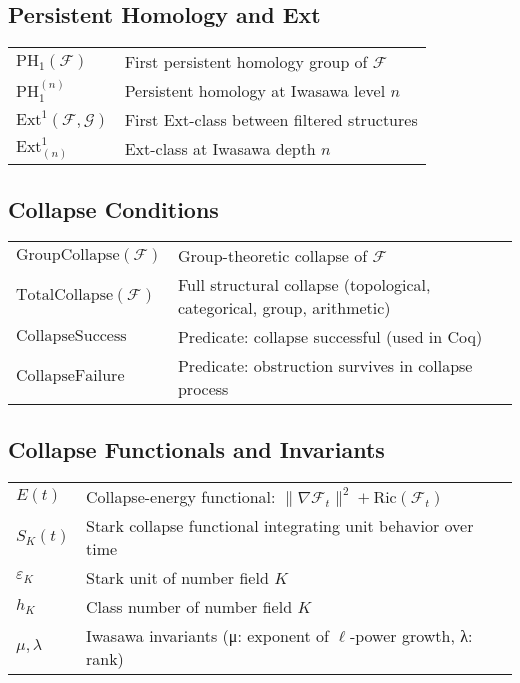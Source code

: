 \documentclass[11pt]{article}
\begin{document}
\subsection*{Persistent Homology and Ext}

\begin{tabular}{ll}
$\mathrm{PH}_1(\mathcal{F})$ & First persistent homology group of $\mathcal{F}$ \\
$\mathrm{PH}_1^{(n)}$ & Persistent homology at Iwasawa level $n$ \\
$\mathrm{Ext}^1(\mathcal{F}, \mathcal{G})$ & First Ext-class between filtered structures \\
$\mathrm{Ext}^1_{(n)}$ & Ext-class at Iwasawa depth $n$ \\
\end{tabular}

\subsection*{Collapse Conditions}

\begin{tabular}{ll}
$\mathrm{GroupCollapse}(\mathcal{F})$ & Group-theoretic collapse of $\mathcal{F}$ \\
$\mathrm{TotalCollapse}(\mathcal{F})$ & Full structural collapse (topological, categorical, group, arithmetic) \\
$\mathrm{CollapseSuccess}$ & Predicate: collapse successful (used in Coq) \\
$\mathrm{CollapseFailure}$ & Predicate: obstruction survives in collapse process \\
\end{tabular}

\subsection*{Collapse Functionals and Invariants}

\begin{tabular}{ll}
$E(t)$ & Collapse-energy functional: $\| \nabla \mathcal{F}_t \|^2 + \mathrm{Ric}(\mathcal{F}_t)$ \\
$S_K(t)$ & Stark collapse functional integrating unit behavior over time \\
$\varepsilon_K$ & Stark unit of number field $K$ \\
$h_K$ & Class number of number field $K$ \\
$\mu, \lambda$ & Iwasawa invariants (μ: exponent of $\ell$-power growth, λ: rank) \\
\end{tabular}
\end{document}
